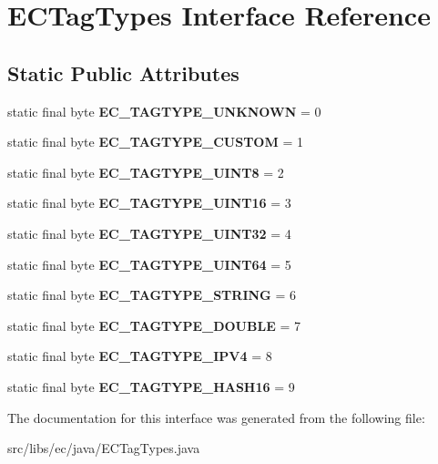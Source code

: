 \section{ECTagTypes Interface Reference}
\label{interfaceECTagTypes}
\subsection*{Static Public Attributes}
\begin{DoxyCompactItemize}
\item 
static final byte {\bfseries EC\_\-TAGTYPE\_\-UNKNOWN} = 0\label{interfaceECTagTypes_a9a73cd1db74097b8c35ae7e3b6d00035}

\item 
static final byte {\bfseries EC\_\-TAGTYPE\_\-CUSTOM} = 1\label{interfaceECTagTypes_a5195d1b666b98b12e1250955432e613e}

\item 
static final byte {\bfseries EC\_\-TAGTYPE\_\-UINT8} = 2\label{interfaceECTagTypes_a51a8585ede1902c5ec6e078fcf9d9839}

\item 
static final byte {\bfseries EC\_\-TAGTYPE\_\-UINT16} = 3\label{interfaceECTagTypes_a606dfdd2bf29a14df44b604f6b55fc20}

\item 
static final byte {\bfseries EC\_\-TAGTYPE\_\-UINT32} = 4\label{interfaceECTagTypes_ae0446da92d457fd884088fad14fe7c93}

\item 
static final byte {\bfseries EC\_\-TAGTYPE\_\-UINT64} = 5\label{interfaceECTagTypes_ac6321999ddd3db741633183f114317d7}

\item 
static final byte {\bfseries EC\_\-TAGTYPE\_\-STRING} = 6\label{interfaceECTagTypes_ad44a42895968a14e7ae15316796890a4}

\item 
static final byte {\bfseries EC\_\-TAGTYPE\_\-DOUBLE} = 7\label{interfaceECTagTypes_ae8159169c0f6d7fb088e05934c129423}

\item 
static final byte {\bfseries EC\_\-TAGTYPE\_\-IPV4} = 8\label{interfaceECTagTypes_a4029051fc82fdfafd7ac6d2e0b3346d7}

\item 
static final byte {\bfseries EC\_\-TAGTYPE\_\-HASH16} = 9\label{interfaceECTagTypes_ae94107dcc875870c752e59ff68ca1395}

\end{DoxyCompactItemize}


The documentation for this interface was generated from the following file:\begin{DoxyCompactItemize}
\item 
src/libs/ec/java/ECTagTypes.java\end{DoxyCompactItemize}
